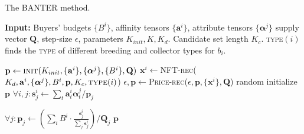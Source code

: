 \documentclass[conference]{IEEEtran}
\newcommand{\1}[1]{\mathds{1}\left[#1\right]}
\theoremstyle{plain}
\newcommand{\method}{\textsf{BANTER}\xspace}
\newcommand{\finddemand}{\textsc{NFT-rec}\xspace}
\newcommand{\findprice}{\textsc{Price-rec}\xspace}
\begin{document}
\begin{algorithm}[t]
    \small
    \caption{The \method method.}
    \label{alg:method}
    \textbf{Input:} Buyers' budgets $\{B^i\}$, affinity tensors $\{\mathbf{a}^i\}$, attribute tensors $\{\bm{\alpha}^j\}$ supply vector $\mathbf{Q}$, step-size $\epsilon$, parameters $K_{init}, K, K_d$. Candidate set length $K_c$. \textsc{type}$(i)$ finds the \textsc{type} of different breeding and collector types for $b_i$.
    \begin{algorithmic}[1]
    \State $\mathbf{p}\gets \textsc{init}(K_{init}, \{\mathbf{a}^i\}, \{\bm{\alpha}^j\}, \{B^i\}, \mathbf{Q})$
            \State $\mathbf{x}^i\gets$\finddemand($K_{d}, \mathbf{a}^i, \{\bm{\alpha}^j\}, B^i, \mathbf{p}, K_c, \textsc{type}(i)$)
        \EndFor
        \State $\epsilon, \mathbf{p} \gets$\findprice($\epsilon, \mathbf{p}, \{\mathbf{x}^i\}, \mathbf{Q}$)
    \EndFor
        \State random initialize $\mathbf{p}$
            \State $\forall i, j: \mathbf{s}^i_j \gets \sum_t\mathbf{a}^i_t\bm{\alpha}^j_t/\mathbf{p}_j$

            \State 
            $\forall j: \mathbf{p}_j\gets \left(\sum_i B^i\cdot \frac{\mathbf{s}^i_j}{\sum_j \mathbf{s}^i_j}\right)/\mathbf{Q}_j$
        \EndFor
        \Return $\mathbf{p}$
    \EndProcedure
    \end{algorithmic}
\end{algorithm}
\end{document}
